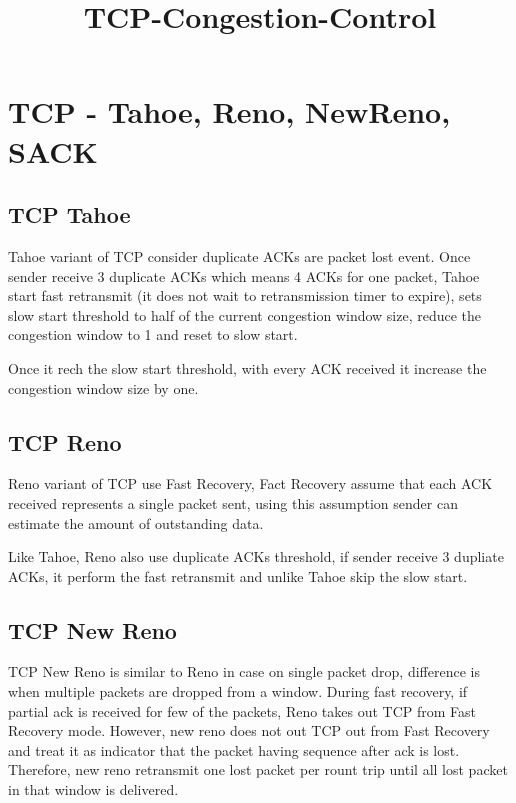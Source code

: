 \documentclass[11pt]{article}
\title{TCP-Congestion-Control}
\begin{document}
    
    
    \maketitle
    
    

    
    \section{TCP - Tahoe, Reno, NewReno,
SACK}\label{tcp---tahoe-reno-newreno-sack}

    \subsection{TCP Tahoe}\label{tcp-tahoe}

Tahoe variant of TCP consider duplicate ACKs are packet lost event. Once
sender receive 3 duplicate ACKs which means 4 ACKs for one packet, Tahoe
start fast retransmit (it does not wait to retransmission timer to
expire), sets slow start threshold to half of the current congestion
window size, reduce the congestion window to 1 and reset to slow start.

Once it rech the slow start threshold, with every ACK received it
increase the congestion window size by one.

    \subsection{TCP Reno}\label{tcp-reno}

Reno variant of TCP use Fast Recovery, Fact Recovery assume that each
ACK received represents a single packet sent, using this assumption
sender can estimate the amount of outstanding data.

Like Tahoe, Reno also use duplicate ACKs threshold, if sender receive 3
dupliate ACKs, it perform the fast retransmit and unlike Tahoe skip the
slow start.

    \subsection{TCP New Reno}\label{tcp-new-reno}

TCP New Reno is similar to Reno in case on single packet drop,
difference is when multiple packets are dropped from a window. During
fast recovery, if partial ack is received for few of the packets, Reno
takes out TCP from Fast Recovery mode. However, new reno does not out
TCP out from Fast Recovery and treat it as indicator that the packet
having sequence after ack is lost. Therefore, new reno retransmit one
lost packet per rount trip until all lost packet in that window is
delivered.
\end{document}

